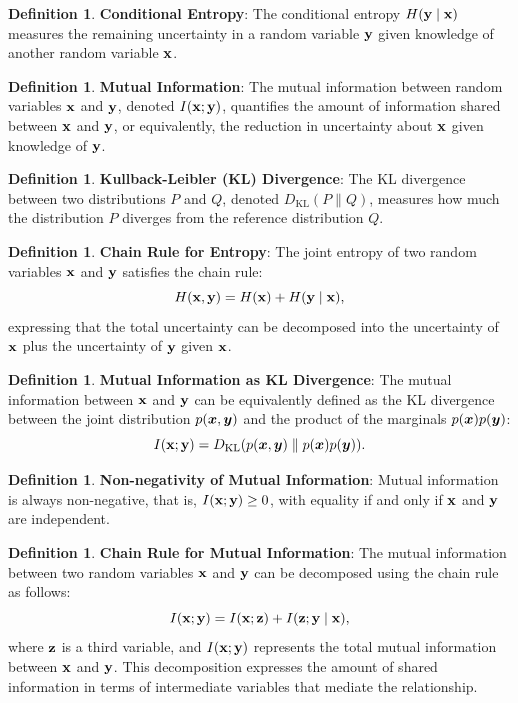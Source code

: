 \documentclass[11pt, oneside]{book}
\theoremstyle{plain}
\theoremstyle{definition}
\newtheorem{definition}[theorem]{Definition}
\theoremstyle{remark}
\begin{document}
\begin{definition}
\textbf{Conditional Entropy}: The conditional entropy $H({\mathbf{y}} \mid {\mathbf{x}})$ measures the remaining uncertainty in a random variable ${\mathbf{y}}$ given knowledge of another random variable ${\mathbf{x}}$.
\label{def:conditional_entropy}
\end{definition}

\begin{definition}
\textbf{Mutual Information}: The mutual information between random variables ${\mathbf{x}}$ and ${\mathbf{y}}$, denoted $I({\mathbf{x}}; {\mathbf{y}})$, quantifies the amount of information shared between ${\mathbf{x}}$ and ${\mathbf{y}}$, or equivalently, the reduction in uncertainty about ${\mathbf{x}}$ given knowledge of ${\mathbf{y}}$.
\label{def:mutual_information}
\end{definition}

\begin{definition}
\textbf{Kullback-Leibler (KL) Divergence}: The KL divergence between two distributions $P$ and $Q$, denoted $D_{\mathrm{KL}}(P \parallel Q)$, measures how much the distribution $P$ diverges from the reference distribution $Q$.
\label{def:kl_divergence}
\end{definition}

\begin{definition}
\textbf{Chain Rule for Entropy}: The joint entropy of two random variables ${\mathbf{x}}$ and ${\mathbf{y}}$ satisfies the chain rule:
\[
H({\mathbf{x}}, {\mathbf{y}}) = H({\mathbf{x}}) + H({\mathbf{y}} \mid {\mathbf{x}}),
\]
expressing that the total uncertainty can be decomposed into the uncertainty of ${\mathbf{x}}$ plus the uncertainty of ${\mathbf{y}}$ given ${\mathbf{x}}$.
\label{def:chain_rule}
\end{definition}

\begin{definition}
\textbf{Mutual Information as KL Divergence}: The mutual information between ${\mathbf{x}}$ and ${\mathbf{y}}$ can be equivalently defined as the KL divergence between the joint distribution $p({\bm{x}}, {\bm{y}})$ and the product of the marginals $p({\bm{x}})p({\bm{y}})$:
\[
I({\mathbf{x}}; {\mathbf{y}}) = D_{\mathrm{KL}}(p({\bm{x}}, {\bm{y}}) \parallel p({\bm{x}})p({\bm{y}})).
\]
\label{def:mi_kl}
\end{definition}

\begin{definition}
\textbf{Non-negativity of Mutual Information}: Mutual information is always non-negative, that is, $I({\mathbf{x}}; {\mathbf{y}}) \geq 0$, with equality if and only if ${\mathbf{x}}$ and ${\mathbf{y}}$ are independent.
\label{def:nonneg_mi}
\end{definition}

\begin{definition}
\textbf{Chain Rule for Mutual Information}: The mutual information between two random variables ${\mathbf{x}}$ and ${\mathbf{y}}$ can be decomposed using the chain rule as follows:
\[
I({\mathbf{x}}; {\mathbf{y}}) = I({\mathbf{x}}; {\mathbf{z}}) + I({\mathbf{z}}; {\mathbf{y}} \mid {\mathbf{x}}),
\]
where ${\mathbf{z}}$ is a third variable, and $I({\mathbf{x}}; {\mathbf{y}})$ represents the total mutual information between ${\mathbf{x}}$ and ${\mathbf{y}}$. This decomposition expresses the amount of shared information in terms of intermediate variables that mediate the relationship.
\label{def:chain_rule_mi}
\end{definition}
\end{document}
